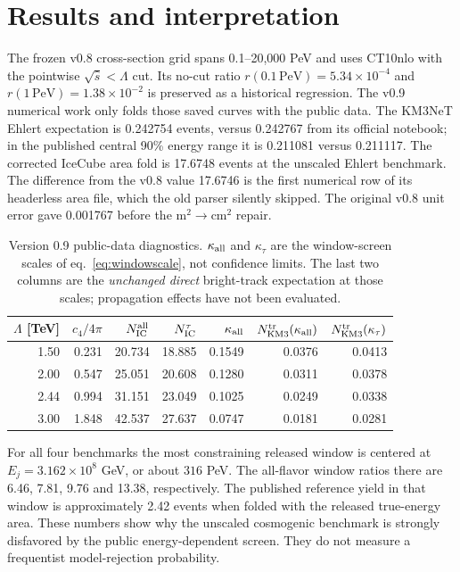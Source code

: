 \documentclass[11pt,a4paper]{article}
\begin{document}
\section{Results and interpretation}
The frozen v0.8 cross-section grid spans 0.1--20,000 PeV and uses CT10nlo
with the pointwise $\sqrt{\hat s}<\Lambda$ cut.  Its no-cut ratio
$r(0.1\,\mathrm{PeV})=5.34\times10^{-4}$ and
$r(1\,\mathrm{PeV})=1.38\times10^{-2}$ is preserved as a historical
regression.  The v0.9 numerical work only folds those saved curves with
the public data.  The KM3NeT Ehlert expectation is 0.242754 events, versus
0.242767 from its official notebook; in the published central 90\% energy
range it is 0.211081 versus 0.211117.  The corrected IceCube area fold is
17.6748 events at the unscaled Ehlert benchmark.  The difference from the
v0.8 value 17.6746 is the first numerical row of its headerless area file,
which the old parser silently skipped.  The original v0.8 unit error gave
0.001767 before the $\mathrm{m}^2\to\mathrm{cm}^2$ repair.

\begin{table}[t]
\centering
\caption{Version 0.9 public-data diagnostics.  $\kappa_{\rm all}$ and
$\kappa_{\tau}$ are the window-screen scales of
eq.~\eqref{eq:windowscale}, not confidence limits.  The last two columns
are the \emph{unchanged direct} bright-track expectation at those scales;
propagation effects have not been evaluated.}
\label{tab:results}
\begin{tabular}{@{}rrrrrrr@{}}
\toprule
$\Lambda$ [TeV] & $c_4/4\pi$ & $N_{\rm IC}^{\rm all}$ &
$N_{\rm IC}^{\tau}$ & $\kappa_{\rm all}$ &
$N_{\rm KM3}^{\rm tr}(\kappa_{\rm all})$ &
$N_{\rm KM3}^{\rm tr}(\kappa_{\tau})$\\
\midrule
1.50 & 0.231 & 20.734 & 18.885 & 0.1549 & 0.0376 & 0.0413\\
2.00 & 0.547 & 25.051 & 20.608 & 0.1280 & 0.0311 & 0.0378\\
2.44 & 0.994 & 31.151 & 23.049 & 0.1025 & 0.0249 & 0.0338\\
3.00 & 1.848 & 42.537 & 27.637 & 0.0747 & 0.0181 & 0.0281\\
\bottomrule
\end{tabular}
\end{table}

For all four benchmarks the most constraining released window is centered
at $E_j=3.162\times10^8$ GeV, or about $316$ PeV.  The all-flavor window
ratios there are 6.46, 7.81, 9.76 and 13.38, respectively.  The published
reference yield in that window is approximately 2.42 events when folded
with the released true-energy area.  These numbers show why the unscaled
cosmogenic benchmark is strongly disfavored by the public energy-dependent
screen.  They do not measure a frequentist model-rejection probability.
\end{document}
